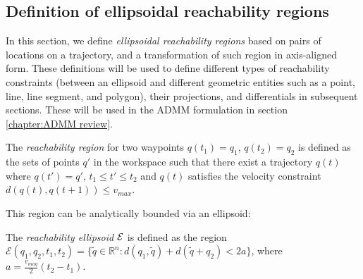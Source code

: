 \documentclass[journal]{IEEEtran}  %
\begin{document}
\subsection{Definition of ellipsoidal reachability regions}\label{sec:reachability}
  In this section, we define  \emph{ellipsoidal reachability regions} based on pairs of locations on a trajectory, and a transformation of such region in axis-aligned form. These definitions will be used to define different types of reachability constraints (between an ellipsoid and different geometric entities such as a point, line, line segment, and polygon), their projections, and differentials in subsequent sections. 
  These will be used in the ADMM formulation in section \ref{chapter:ADMM review}.


\begin{definition}\label{sec:ellipsoidal definition}
	The \emph{reachability region} for two waypoints $q(t_1)=q_1$, $q(t_2)=q_2$ is defined as the sets of points $q'$ in the workspace such that there exist a trajectory $q(t)$ where $q(t')=q'$, $t_1\leq t' \leq t_2$ and $q(t)$ satisfies the velocity constraint $d(q(t),q(t+1))\leq v_{max}$.
\end{definition}
This region can be analytically bounded via an ellipsoid:
\begin{definition}\label{def:Reachability}
	The \emph{reachability ellipsoid $\mathcal{E}$} is defined as the region  $\mathcal{E}(q_1,q_2,t_{1},t_{2})=\{\tilde{q}\in\mathbb{R}^n: d(q_1,\tilde{q})+d(\tilde{q}+q_2)<2a\}$, where $a=\frac{v_{maq}}{2}(t_2-t_1)$.
\end{definition}
\end{document}
